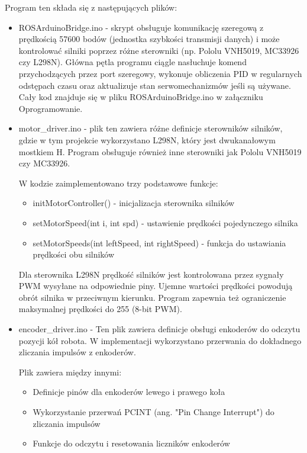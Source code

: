 \documentclass[a4paper,twoside,12pt]{book}
\begin{document}
Program ten składa się z następujących plików:
\begin{itemize}
	\item ROSArduinoBridge.ino -  skrypt obsługuje komunikację szeregową z prędkością 57600 bodów (jednostka szybkości transmisji danych) i może kontrolować silniki poprzez różne sterowniki (np. Pololu VNH5019, MC33926 czy L298N). 
	Główna pętla programu ciągle nasłuchuje komend przychodzących przez port szeregowy, wykonuje obliczenia PID w regularnych odstępach czasu oraz aktualizuje stan serwomechanizmów jeśli są używane. Cały kod znajduje się w pliku ROSArduinoBridge.ino w załączniku Oprogramowanie.
	\newpage
	\item motor\_driver.ino - plik ten zawiera różne definicje sterowników silników, gdzie w tym projekcie wykorzystano  L298N, który jest dwukanałowym mostkiem H. Program obsługuje również inne sterowniki jak Pololu VNH5019 czy MC33926.

	W kodzie zaimplementowano trzy podstawowe funkcje:
	\begin{itemize}
	\item initMotorController() - inicjalizacja sterownika silników
	\item setMotorSpeed(int i, int spd) - ustawienie prędkości pojedynczego silnika 
	\item setMotorSpeeds(int leftSpeed, int rightSpeed) - funkcja do ustawiania prędkości obu silników
	\end{itemize}

	Dla sterownika L298N prędkość silników jest kontrolowana przez sygnały PWM wysyłane na odpowiednie piny. Ujemne wartości prędkości powodują obrót silnika w przeciwnym kierunku. Program zapewnia też ograniczenie maksymalnej prędkości do 255 (8-bit PWM).
	\item encoder\_driver.ino - Ten plik zawiera definicje obsługi enkoderów do odczytu pozycji kół robota. W implementacji wykorzystano przerwania do dokładnego zliczania impulsów z enkoderów.

	Plik zawiera między innymi:
	\begin{itemize}
	\item Definicje pinów dla enkoderów lewego i prawego koła
	\item Wykorzystanie przerwań PCINT (ang. "Pin Change Interrupt") do zliczania impulsów
	\item Funkcje do odczytu i resetowania liczników enkoderów
	\end{itemize}

	


\end{itemize}
\end{document}

